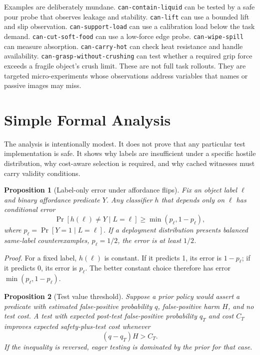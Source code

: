\documentclass{article}
\newtheorem{proposition}{Proposition}
\begin{document}
Examples are deliberately mundane.  \texttt{can-contain-liquid} can be tested
by a safe pour probe that observes leakage and stability.  \texttt{can-lift}
can use a bounded lift and slip observation.  \texttt{can-support-load} can use
a calibration load below the task demand.  \texttt{can-cut-soft-food} can use a
low-force edge probe.  \texttt{can-wipe-spill} can measure absorption.
\texttt{can-carry-hot} can check heat resistance and handle availability.
\texttt{can-grasp-without-crushing} can test whether a required grip force
exceeds a fragile object's crush limit.  These are not full task rollouts.  They
are targeted micro-experiments whose observations address variables that names
or passive images may miss.

\section{Simple Formal Analysis}

The analysis is intentionally modest.  It does not prove that any particular
test implementation is safe.  It shows why labels are insufficient under a
specific hostile distribution, why cost-aware selection is required, and why
cached witnesses must carry validity conditions.

\begin{proposition}[Label-only error under affordance flips]
Fix an object label $\ell$ and binary affordance predicate $Y$.  Any classifier
$h$ that depends only on $\ell$ has conditional error
\[
  \Pr[h(\ell)\neq Y \mid L=\ell] \geq \min(p_{\ell},1-p_{\ell}),
\]
where $p_{\ell}=\Pr[Y=1\mid L=\ell]$.  If a deployment distribution presents
balanced same-label counterexamples, $p_{\ell}=1/2$, the error is at least
$1/2$.
\end{proposition}

\textit{Proof.}
For a fixed label, $h(\ell)$ is constant.  If it predicts 1, its error is
$1-p_{\ell}$; if it predicts 0, its error is $p_{\ell}$.  The better constant
choice therefore has error $\min(p_{\ell},1-p_{\ell})$.

\begin{proposition}[Test value threshold]
Suppose a prior policy would assert a predicate with estimated false-positive
probability $q$, false-positive harm $H$, and no test cost.  A test with
expected post-test false-positive probability $q_T$ and cost $C_T$ improves
expected safety-plus-test cost whenever
\[
  (q-q_T)H > C_T .
\]
If the inequality is reversed, eager testing is dominated by the prior for that
case.
\end{proposition}
\end{document}
